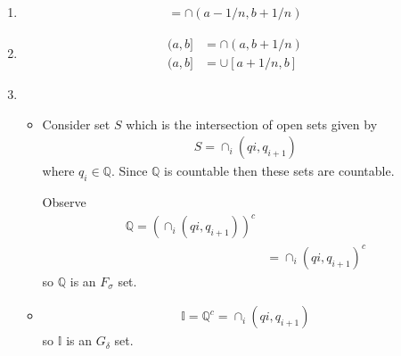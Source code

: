 \begin{enumerate}[label=(\alph*)]
    \item 
    \begin{align*}
        [a,b] = \cap (a-1/n, b+1/n)
    \end{align*}

    \item
    \begin{align*}
        (a,b] &= \cap (a, b+1/n) \\
        (a,b] &= \cup [a+1/n, b] 
    \end{align*}

    \item
    \begin{itemize}
        \item 
        Consider set $S$ which is the intersection of open sets given by
        \begin{align*}
            S = \cap_i (qi, q_{i+1})
        \end{align*}
        where $q_i \in \mathbb{Q}$. Since $\mathbb{Q}$ is countable then these sets are countable.
        
        Observe
        \begin{align*}
            \mathbb{Q} = (\cap_i (qi, q_{i+1}))^c \\
            &= \cap_i (qi, q_{i+1})^c
        \end{align*}
        so $\mathbb{Q}$ is an $F_\sigma$ set.

        \item
        \begin{align*}
            \mathbb{I} = \mathbb{Q}^c = \cap_i (qi, q_{i+1})
        \end{align*}
        so $\mathbb{I}$ is an $G_\delta$ set.
    \end{itemize}
\end{enumerate}


